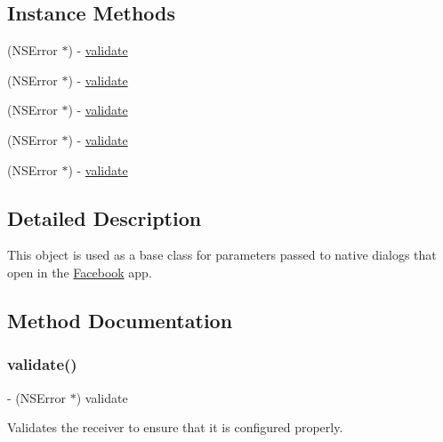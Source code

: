 \subsection*{Instance Methods}
\begin{DoxyCompactItemize}
\item 
(N\+S\+Error $\ast$) -\/ \hyperlink{interfaceFBDialogsParams_a627baaa7e2e59c95e7d99b31e659c9b4}{validate}
\item 
(N\+S\+Error $\ast$) -\/ \hyperlink{interfaceFBDialogsParams_a627baaa7e2e59c95e7d99b31e659c9b4}{validate}
\item 
(N\+S\+Error $\ast$) -\/ \hyperlink{interfaceFBDialogsParams_a627baaa7e2e59c95e7d99b31e659c9b4}{validate}
\item 
(N\+S\+Error $\ast$) -\/ \hyperlink{interfaceFBDialogsParams_a627baaa7e2e59c95e7d99b31e659c9b4}{validate}
\item 
(N\+S\+Error $\ast$) -\/ \hyperlink{interfaceFBDialogsParams_a627baaa7e2e59c95e7d99b31e659c9b4}{validate}
\end{DoxyCompactItemize}


\subsection{Detailed Description}
This object is used as a base class for parameters passed to native dialogs that open in the \hyperlink{interfaceFacebook}{Facebook} app. 

\subsection{Method Documentation}
\mbox{\label{interfaceFBDialogsParams_a627baaa7e2e59c95e7d99b31e659c9b4}} 
\subsubsection{\texorpdfstring{validate()}{validate()}\hspace{0.1cm}{\footnotesize\ttfamily [1/5]}}
{\footnotesize\ttfamily -\/ (N\+S\+Error $\ast$) validate \begin{DoxyParamCaption}{ }\end{DoxyParamCaption}}

Validates the receiver to ensure that it is configured properly. \mbox{\label{interfaceFBDialogsParams_a627baaa7e2e59c95e7d99b31e659c9b4}} 
